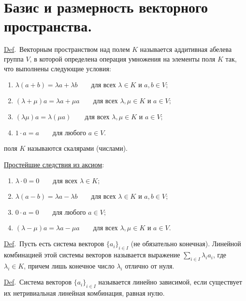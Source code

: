\documentclass[a4paper]{article}%
\renewcommand{\de}{\par\noindent\underline{Def}.\ }%
\renewcommand{\ab}{\par\noindent}%
\begin{document}
\section{Базис и размерность векторного пространства.}%
\label{q1}%
\par\de Векторным пространством над полем $K$ называется аддитивная абелева группа $V$, в которой определена
операция умножения на элементы поля $K$ так, что выполнены следующие условия:
\begin{enumerate}
    \item $\lambda(a+b)=\lambda a+\lambda b \qquad \mbox{для всех } \lambda\in K \mbox{ и }a, b\in V;$
    \item $(\lambda+\mu)a=\lambda a+\mu a \qquad\mbox{для всех }\lambda, \mu\in K\mbox{ и }a\in V;$
    \item $(\lambda\mu)a=\lambda(\mu a) \qquad\mbox{для всех }\lambda, \mu\in K\mbox{ и }a\in V;$
    \item $1\cdot a=a\qquad\mbox{для любого }a\in V.$
\end{enumerate}
 поля $K$ называются скалярами (числами).%
\ab\underline{Простейшие следствия из аксиом}:
\begin{enumerate}
    \item $\lambda\cdot 0=0\qquad\mbox{для всех }\lambda\in K;$
    \item $\lambda(a-b)=\lambda a-\lambda b\qquad\mbox{для всех }\lambda\in K \mbox{ и }a, b\in V;$
    \item $0\cdot a=0\qquad\mbox{для любого }a\in V;$
    \item $(\lambda-\mu)a=\lambda a-\mu a\qquad\mbox{для всех }\lambda,\mu\in K\mbox{ и }a\in V.$
\end{enumerate}
\de Пусть есть система векторов $\{a_i\} _{i\in I}$ (не обязательно конечная). Линейной комбинацией этой
системы векторов называется выражение $\sum\limits_{i\in I} \lambda_i a_i$, где $\lambda_i\in K$, причем лишь
конечное
число $\lambda_i$ отлично от нуля. %

\de Система векторов $\{a_i\}_{i\in I}$ называется линейно зависимой, если существует их нетривиальная линейная
комбинация, равная нулю. %
\end{document}
